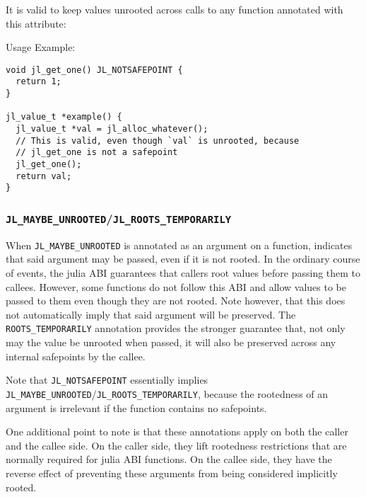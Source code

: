 It is valid to keep values unrooted across calls to any function annotated with this attribute:



Usage Example:




\begin{lstlisting}
void jl_get_one() JL_NOTSAFEPOINT {
  return 1;
}

jl_value_t *example() {
  jl_value_t *val = jl_alloc_whatever();
  // This is valid, even though `val` is unrooted, because
  // jl_get_one is not a safepoint
  jl_get_one();
  return val;
}
\end{lstlisting}



\hypertarget{2060328680206426649}{}


\subsubsection{\texttt{JL\_MAYBE\_UNROOTED}/\texttt{JL\_ROOTS\_TEMPORARILY}}



When \texttt{JL\_MAYBE\_UNROOTED} is annotated as an argument on a function, indicates that said argument may be passed, even if it is not rooted. In the ordinary course of events, the julia ABI guarantees that callers root values before passing them to callees. However, some functions do not follow this ABI and allow values to be passed to them even though they are not rooted. Note however, that this does not automatically imply that said argument will be preserved. The \texttt{ROOTS\_TEMPORARILY} annotation provides the stronger guarantee that, not only may the value be unrooted when passed, it will also be preserved across any internal safepoints by the callee.



Note that \texttt{JL\_NOTSAFEPOINT} essentially implies \texttt{JL\_MAYBE\_UNROOTED}/\texttt{JL\_ROOTS\_TEMPORARILY}, because the rootedness of an argument is irrelevant if the function contains no safepoints.



One additional point to note is that these annotations apply on both the caller and the callee side. On the caller side, they lift rootedness restrictions that are normally required for julia ABI functions. On the callee side, they have the reverse effect of preventing these arguments from being considered implicitly rooted.



